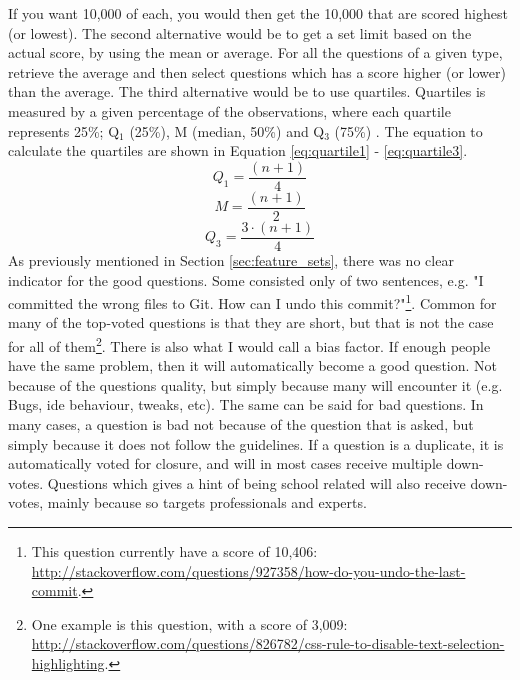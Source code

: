 If you want 10,000 of each, you would then get the 10,000 that are scored highest (or lowest).
The second alternative would be to get a set limit based on the actual score, by using the mean or average.
For all the questions of a given type, retrieve the average and then select questions which has a score higher (or lower) than the average.
The third alternative would be to use quartiles. 
Quartiles is measured by a given percentage of the observations, where each quartile represents 25\%; 
Q$_{1}$ (25\%), M (median, 50\%) and Q$_{3}$ (75\%) \cite{Hagen2011}.
The equation to calculate the quartiles are shown in Equation \ref{eq:quartile1} - \ref{eq:quartile3}.
\begin{equation}\label{eq:quartile1}
Q_{1} = \frac{(n + 1)}{4}
\end{equation}
\begin{equation}\label{eq:quartile2}
M = \frac{(n + 1)}{2}
\end{equation}
\begin{equation}\label{eq:quartile3}
Q_{3} = \frac{3 \cdot (n + 1)}{4}
\end{equation}
As previously mentioned in Section \ref{sec:feature_sets}, there was no clear indicator for the good questions. 
Some consisted only of two sentences, e.g. "I committed the wrong files to Git. How can I undo this commit?"\footnote{
	This question currently have a score of 10,406: \\ 
	\url{http://stackoverflow.com/questions/927358/how-do-you-undo-the-last-commit}.
}. Common for many of the top-voted questions is that they are short, but that is not the case for all of them\footnote{
	One example is this question, with a score of 3,009: \\
	\url{http://stackoverflow.com/questions/826782/css-rule-to-disable-text-selection-highlighting}.
}.
There is also what I would call a bias factor. 
If enough people have the same problem, then it will automatically become a good question. 
Not because of the questions quality, but simply because many will encounter it (e.g. Bugs, \gls{ide} behaviour, tweaks, etc).
The same can be said for bad questions. 
In many cases, a question is bad not because of the question that is asked, but simply because it does not follow the guidelines. 
If a question is a duplicate, it is automatically voted for closure, and will in most cases receive multiple down-votes. 
Questions which gives a hint of being school related will also receive down-votes, mainly because \gls{so} targets professionals and experts. 
